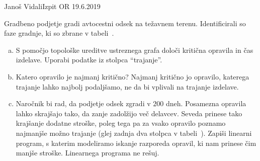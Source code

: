 \begin{naloga}{Janoš Vidali}{Izpit OR 19.6.2019}
\begin{vprasanje}
Gradbeno podjetje gradi avtocestni odsek na težavnem terenu.
Identificirali so faze grad\-nje, ki so zbrane v tabeli~\tab.

\begin{enumerate}[(a)]
\item S pomočjo topološke ureditve ustreznega grafa
določi kritična opravila in čas izdelave.
Uporabi podatke iz stolpca ``trajanje''.

\item Katero opravilo je najmanj kritično?
Najmanj kritično jo opravilo,
katerega trajanje lahko najbolj podaljšamo,
ne da bi vplivali na trajanje izdelave.

\item Naročnik bi rad, da podjetje odsek zgradi v $200$ dneh.
Posamezna opravila lahko skrajšajo tako, da zanje zadolžijo več delavcev.
Seveda prinese tako krajšanje dodatne stroške,
poleg tega pa za vsako opravilo poznamo najmanjše možno trajanje
(glej zadnja dva stolpca v tabeli~\tab).
Zapiši linearni program,
s katerim modeliramo iskanje razporeda opravil,
ki nam prinese čim manjše stroške.
Linearnega programa ne rešuj.
\end{enumerate}
%
\begin{tabela}
\end{tabela}
\end{vprasanje}


\end{naloga}
